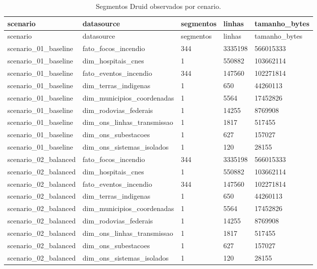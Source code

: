 \begin{landscape}
{
\scriptsize
\setlength{\tabcolsep}{4pt}
\renewcommand{\arraystretch}{1.15}
\begin{longtable}{lllll}
\caption{Segmentos Druid observados por cenario.}\\
\toprule
scenario & datasource & segmentos & linhas & tamanho\_bytes \\
\midrule
\endfirsthead
\toprule
scenario & datasource & segmentos & linhas & tamanho\_bytes \\
\midrule
\endhead
scenario\_01\_baseline & fato\_focos\_incendio & 344 & 3335198 & 566015333 \\
scenario\_01\_baseline & dim\_hospitais\_cnes & 1 & 550882 & 103662114 \\
scenario\_01\_baseline & fato\_eventos\_incendio & 344 & 147560 & 102271814 \\
scenario\_01\_baseline & dim\_terras\_indigenas & 1 & 650 & 44260113 \\
scenario\_01\_baseline & dim\_municipios\_coordenadas & 1 & 5564 & 17452826 \\
scenario\_01\_baseline & dim\_rodovias\_federais & 1 & 14255 & 8769908 \\
scenario\_01\_baseline & dim\_ons\_linhas\_transmissao & 1 & 1817 & 517455 \\
scenario\_01\_baseline & dim\_ons\_subestacoes & 1 & 627 & 157027 \\
scenario\_01\_baseline & dim\_ons\_sistemas\_isolados & 1 & 120 & 28155 \\
scenario\_02\_balanced & fato\_focos\_incendio & 344 & 3335198 & 566015333 \\
scenario\_02\_balanced & dim\_hospitais\_cnes & 1 & 550882 & 103662114 \\
scenario\_02\_balanced & fato\_eventos\_incendio & 344 & 147560 & 102271814 \\
scenario\_02\_balanced & dim\_terras\_indigenas & 1 & 650 & 44260113 \\
scenario\_02\_balanced & dim\_municipios\_coordenadas & 1 & 5564 & 17452826 \\
scenario\_02\_balanced & dim\_rodovias\_federais & 1 & 14255 & 8769908 \\
scenario\_02\_balanced & dim\_ons\_linhas\_transmissao & 1 & 1817 & 517455 \\
scenario\_02\_balanced & dim\_ons\_subestacoes & 1 & 627 & 157027 \\
scenario\_02\_balanced & dim\_ons\_sistemas\_isolados & 1 & 120 & 28155 \\

\end{longtable}}
\end{landscape}
